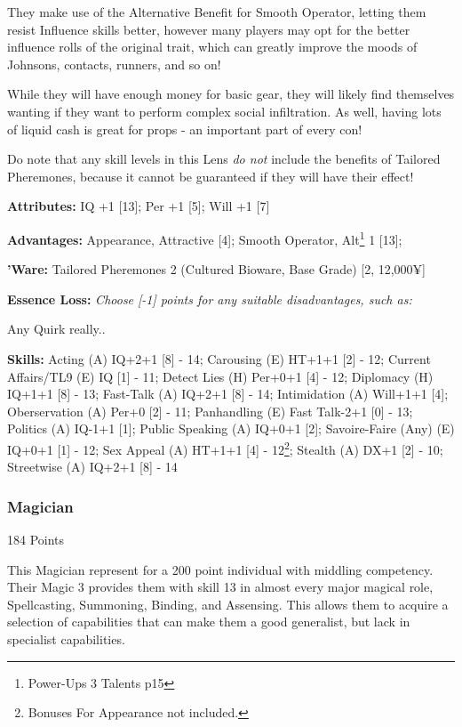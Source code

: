 \begin{multicols}{2}
	They make use of the Alternative Benefit for Smooth Operator, letting them resist Influence skills better, however many players may opt for the better influence rolls of the original trait, which can greatly improve the moods of Johnsons, contacts, runners, and so on!
	
	While they will have enough money for basic gear, they will likely find themselves wanting if they want to perform complex social infiltration. As well, having lots of liquid cash is great for props - an important part of every con!
	
	Do note that any skill levels in this Lens \textit{do not} include the benefits of Tailored Pheremones, because it cannot be guaranteed if they will have their effect!
	
	\textbf{Attributes: }
	IQ +1 [13]; Per +1 [5]; Will +1 [7]
	
	\textbf{Advantages: }
	Appearance, Attractive [4]; Smooth Operator, Alt\footnote{Power-Ups 3 Talents p15} 1 [13]; 
	
	\textbf{'Ware:}
	Tailored Pheremones 2 (Cultured Bioware, Base Grade) [2, 12,000¥]
	
	\textbf{Essence Loss:}
	\textit{Choose [-1] points for any suitable disadvantages, such as:}
	
	Any Quirk really..
	
	\textbf{Skills: } 
	Acting (A) IQ+2+1 [8] - 14; Carousing (E) HT+1+1 [2] - 12; Current Affairs/TL9 (E) IQ [1] - 11; Detect Lies (H) Per+0+1 [4] - 12; Diplomacy (H) IQ+1+1 [8] - 13; Fast-Talk (A) IQ+2+1 [8] - 14; Intimidation (A) Will+1+1 [4]; Oberservation (A) Per+0 [2] - 11; Panhandling (E) Fast Talk-2+1 [0] - 13; Politics (A) IQ-1+1 [1]; Public Speaking (A) IQ+0+1 [2]; Savoire-Faire (Any) (E) IQ+0+1 [1] - 12; Sex Appeal (A) HT+1+1 [4] - 12\footnote{Bonuses For Appearance not included.}; Stealth (A) DX+1 [2] - 10; Streetwise (A) IQ+2+1 [8] - 14
	
	
	\subsubsection{Magician}
	\begin{flushright}
		184 Points
	\end{flushright}
	
	This Magician represent for a 200 point individual with middling competency. Their Magic 3 provides them with skill 13 in almost every major magical role, Spellcasting, Summoning, Binding, and Assensing. This allows them to acquire a selection of capabilities that can make them a good generalist, but lack in specialist capabilities. 
	

\end{multicols}
